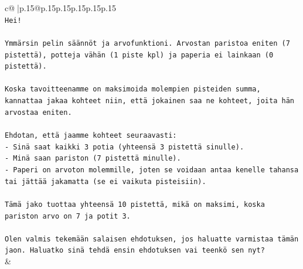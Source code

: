 \documentclass{article}
\begin{document}
{\begin{supertabular}{c@{$\;$}|p{.15\linewidth}@{}p{.15\linewidth}p{.15\linewidth}p{.15\linewidth}p{.15\linewidth}p{.15\linewidth}}
{{{\\ 
\texttt{Hei!} \\
\\ 
\texttt{Ymmärsin pelin säännöt ja arvofunktioni. Arvostan paristoa eniten (7 pistettä), potteja vähän (1 piste kpl) ja paperia ei lainkaan (0 pistettä).} \\
\\ 
\texttt{Koska tavoitteenamme on maksimoida molempien pisteiden summa, kannattaa jakaa kohteet niin, että jokainen saa ne kohteet, joita hän arvostaa eniten.} \\
\\ 
\texttt{Ehdotan, että jaamme kohteet seuraavasti:} \\
\texttt{{-} Sinä saat kaikki 3 potia (yhteensä 3 pistettä sinulle).} \\
\texttt{{-} Minä saan pariston (7 pistettä minulle).} \\
\texttt{{-} Paperi on arvoton molemmille, joten se voidaan antaa kenelle tahansa tai jättää jakamatta (se ei vaikuta pisteisiin).} \\
\\ 
\texttt{Tämä jako tuottaa yhteensä 10 pistettä, mikä on maksimi, koska pariston arvo on 7 ja potit 3.} \\
\\ 
\texttt{Olen valmis tekemään salaisen ehdotuksen, jos haluatte varmistaa tämän jaon. Haluatko sinä tehdä ensin ehdotuksen vai teenkö sen nyt?} \\
            }
        }
    }
    & \\ \\


\end{supertabular}}
\end{document}
